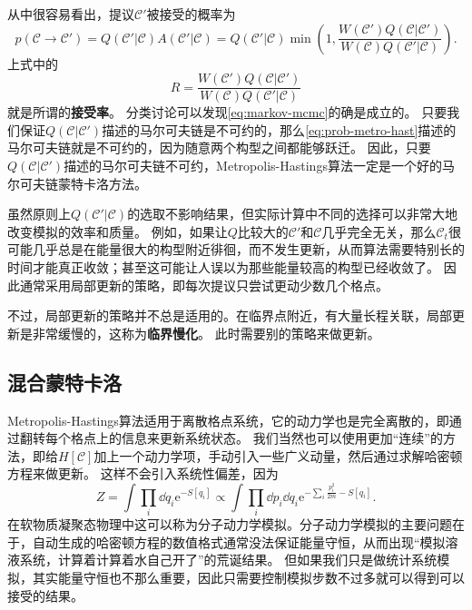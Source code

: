 \documentclass[hyperref, UTF8, a4paper]{ctexart}
\newcommand*{\ee}{\mathrm{e}}
\renewcommand{\autoref}{\prettyref}
\newcommand*{\concept}[1]{{\textbf{#1}}}
\begin{document}
从\autoref{alg:metro-hast}中很容易看出，提议$\mathcal{C}'$被接受的概率为
\begin{equation}
    p(\mathcal{C} \to \mathcal{C}') = Q(\mathcal{C}' | \mathcal{C}) A(\mathcal{C}' | \mathcal{C}) = Q(\mathcal{C}' | \mathcal{C}) \min \left(1, \frac{W(\mathcal{C}') Q(\mathcal{C} | \mathcal{C}')}{W(\mathcal{C}) Q(\mathcal{C}' | \mathcal{C})} \right).
    \label{eq:prob-metro-hast}
\end{equation}
上式中的
\begin{equation}
    R = \frac{W(\mathcal{C}') Q(\mathcal{C} | \mathcal{C}')}{W(\mathcal{C}) Q(\mathcal{C}' | \mathcal{C})}
\end{equation}
就是所谓的\concept{接受率}。
分类讨论可以发现\eqref{eq:markov-mcmc}的确是成立的。
只要我们保证$Q(\mathcal{C} | \mathcal{C}')$描述的马尔可夫链是不可约的，那么\eqref{eq:prob-metro-hast}描述的马尔可夫链就是不可约的，因为随意两个构型之间都能够跃迁。
因此，只要$Q(\mathcal{C} | \mathcal{C}')$描述的马尔可夫链不可约，Metropolis-Hastings算法一定是一个好的马尔可夫链蒙特卡洛方法。

虽然原则上$Q(\mathcal{C}' | \mathcal{C})$的选取不影响结果，但实际计算中不同的选择可以非常大地改变模拟的效率和质量。
例如，如果让$Q$比较大的$\mathcal{C}'$和$\mathcal{C}$几乎完全无关，那么$\mathcal{C}_t$很可能几乎总是在能量很大的构型附近徘徊，而不发生更新，从而算法需要特别长的时间才能真正收敛；甚至这可能让人误以为那些能量较高的构型已经收敛了。
因此通常采用局部更新的策略，即每次提议只尝试更动少数几个格点。

不过，局部更新的策略并不总是适用的。在临界点附近，有大量长程关联，局部更新是非常缓慢的，这称为\concept{临界慢化}。
此时需要别的策略来做更新。

\subsection{混合蒙特卡洛}

Metropolis-Hastings算法适用于离散格点系统，它的动力学也是完全离散的，即通过翻转每个格点上的信息来更新系统状态。
我们当然也可以使用更加“连续”的方法，即给$H[\mathcal{C}]$加上一个动力学项，手动引入一些广义动量，然后通过求解哈密顿方程来做更新。
这样不会引入系统性偏差，因为
\begin{equation}
    Z = \int \prod_i \dd{q_i} \ee^{- S[q_i]} \propto \int \prod_i \dd{p}_i \dd{q}_i \ee^{-\sum_i \frac{p_i^2}{2m} - S[q_i]}.
    \label{eq:molecular-dynamics}
\end{equation}
在软物质凝聚态物理中这可以称为分子动力学模拟。分子动力学模拟的主要问题在于，自动生成的哈密顿方程的数值格式通常没法保证能量守恒，从而出现“模拟溶液系统，计算着计算着水自己开了”的荒诞结果。
但如果我们只是做统计系统模拟，其实能量守恒也不那么重要，因此只需要控制模拟步数不过多就可以得到可以接受的结果。
\end{document}
